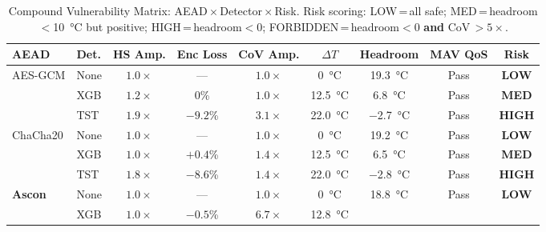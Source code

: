 \begin{table}[!t]
\centering
\caption{Compound Vulnerability Matrix: AEAD\,$\times$\,Detector\,$\times$\,Risk.
  Risk scoring: LOW\,=\,all safe; MED\,=\,headroom$<$\SI{10}{\degreeCelsius}
  but positive; HIGH\,=\,headroom$<$0; FORBIDDEN\,=\,headroom$<$0 \textbf{and}
  CoV\,$>5\times$.}
\label{tab:vulnerability}
\footnotesize
\setlength{\tabcolsep}{3pt}
\begin{tabular}{@{}ll c c c c c c c@{}}
\toprule
\textbf{AEAD} & \textbf{Det.}
  & \textbf{HS Amp.}  & \textbf{Enc Loss}
  & \textbf{CoV Amp.} & {$\Delta T$}
  & \textbf{Headroom} & \textbf{MAV QoS}
  & \textbf{Risk} \\
\midrule
\multirow{3}{*}{AES-GCM}
  & None & $1.0\times$ & {---}
    & $1.0\times$ & \SI{0}{\degreeCelsius}
    & \SI{19.3}{\degreeCelsius}
    & \cellcolor{ptblue!8}Pass
    & \cellcolor{ptblue!8}\textbf{LOW} \\
  & XGB  & $1.2\times$ & 0\%
    & $1.0\times$ & \SI{12.5}{\degreeCelsius}
    & \SI{6.8}{\degreeCelsius}
    & \cellcolor{ptblue!8}Pass
    & \cellcolor{ptgold!15}\textbf{MED} \\
  & TST  & $1.9\times$ & $-9.2$\%
    & $3.1\times$ & \SI{22.0}{\degreeCelsius}
    & $-$\SI{2.7}{\degreeCelsius}
    & \cellcolor{ptblue!8}Pass
    & \cellcolor{ptrose!15}\textbf{HIGH} \\
\midrule
\multirow{3}{*}{ChaCha20}
  & None & $1.0\times$ & {---}
    & $1.0\times$ & \SI{0}{\degreeCelsius}
    & \SI{19.2}{\degreeCelsius}
    & \cellcolor{ptblue!8}Pass
    & \cellcolor{ptblue!8}\textbf{LOW} \\
  & XGB  & $1.0\times$ & $+0.4$\%
    & $1.4\times$ & \SI{12.5}{\degreeCelsius}
    & \SI{6.5}{\degreeCelsius}
    & \cellcolor{ptblue!8}Pass
    & \cellcolor{ptgold!15}\textbf{MED} \\
  & TST  & $1.8\times$ & $-8.6$\%
    & $1.4\times$ & \SI{22.0}{\degreeCelsius}
    & $-$\SI{2.8}{\degreeCelsius}
    & \cellcolor{ptblue!8}Pass
    & \cellcolor{ptrose!15}\textbf{HIGH} \\
\midrule
\multirow{3}{*}{\bfseries Ascon}
  & None & $1.0\times$ & {---}
    & $1.0\times$ & \SI{0}{\degreeCelsius}
    & \SI{18.8}{\degreeCelsius}
    & \cellcolor{ptblue!8}Pass
    & \cellcolor{ptblue!8}\textbf{LOW} \\
  & XGB  & $1.0\times$ & $-0.5$\%
    & $6.7\times$ & \SI{12.8}{\degreeCelsius}

\end{tabular}
\end{table}
